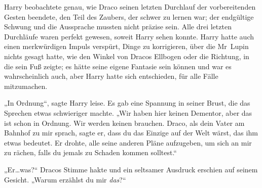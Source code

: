 \later

Harry beobachtete genau, wie Draco seinen letzten Durchlauf der vorbereitenden Gesten beendete, den Teil des Zaubers, der schwer zu lernen war; der endgültige Schwung und die Aussprache mussten nicht präzise sein. Alle drei letzten Durchläufe waren perfekt gewesen, soweit Harry sehen konnte. Harry hatte auch einen merkwürdigen Impuls verspürt, Dinge zu korrigieren, über die Mr~Lupin nichts gesagt hatte, wie den Winkel von Dracos Ellbogen oder die Richtung, in die sein Fuß zeigte; es hätte seine eigene Fantasie sein können und war es wahrscheinlich auch, aber Harry hatte sich entschieden, für alle Fälle mitzumachen.

„In Ordnung“, sagte Harry leise. Es gab eine Spannung in seiner Brust, die das Sprechen etwas schwieriger machte. „Wir haben hier keinen Dementor, aber das ist schon in Ordnung. Wir werden keinen brauchen. Draco, als dein Vater am Bahnhof zu mir sprach, sagte er, dass du das Einzige auf der Welt wärst, das ihm etwas bedeutet. Er drohte, alle seine anderen Pläne aufzugeben, um sich an mir zu rächen, falls du jemals zu Schaden kommen solltest.“

„Er…was?“ Dracos Stimme hakte und ein seltsamer Ausdruck erschien auf seinem Gesicht. „Warum erzählst du mir \emph{das}?“

